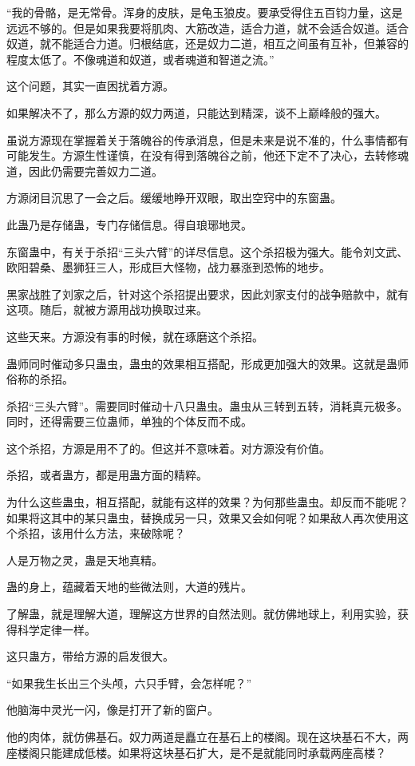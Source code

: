 \begin{this_body}
“我的骨骼，是无常骨。浑身的皮肤，是龟玉狼皮。要承受得住五百钧力量，这是远远不够的。但是如果我要将肌肉、大筋改造，适合力道，就不会适合奴道。适合奴道，就不能适合力道。归根结底，还是奴力二道，相互之间虽有互补，但兼容的程度太低了。不像魂道和奴道，或者魂道和智道之流。”

这个问题，其实一直困扰着方源。

如果解决不了，那么方源的奴力两道，只能达到精深，谈不上巅峰般的强大。

虽说方源现在掌握着关于落魄谷的传承消息，但是未来是说不准的，什么事情都有可能发生。方源生性谨慎，在没有得到落魄谷之前，他还下定不了决心，去转修魂道，因此仍需要完善奴力二道。

方源闭目沉思了一会之后。缓缓地睁开双眼，取出空窍中的东窗蛊。

此蛊乃是存储蛊，专门存储信息。得自琅琊地灵。

东窗蛊中，有关于杀招“三头六臂”的详尽信息。这个杀招极为强大。能令刘文武、欧阳碧桑、墨狮狂三人，形成巨大怪物，战力暴涨到恐怖的地步。

黑家战胜了刘家之后，针对这个杀招提出要求，因此刘家支付的战争赔款中，就有这项。随后，就被方源用战功换取过来。

这些天来。方源没有事的时候，就在琢磨这个杀招。

蛊师同时催动多只蛊虫，蛊虫的效果相互搭配，形成更加强大的效果。这就是蛊师俗称的杀招。

杀招“三头六臂”。需要同时催动十八只蛊虫。蛊虫从三转到五转，消耗真元极多。同时，还得需要三位蛊师，单独的个体反而不成。

这个杀招，方源是用不了的。但这并不意味着。对方源没有价值。

杀招，或者蛊方，都是用蛊方面的精粹。

为什么这些蛊虫，相互搭配，就能有这样的效果？为何那些蛊虫。却反而不能呢？如果将这其中的某只蛊虫，替换成另一只，效果又会如何呢？如果敌人再次使用这个杀招，该用什么方法，来破除呢？

人是万物之灵，蛊是天地真精。

蛊的身上，蕴藏着天地的些微法则，大道的残片。

了解蛊，就是理解大道，理解这方世界的自然法则。就仿佛地球上，利用实验，获得科学定律一样。

这只蛊方，带给方源的启发很大。

“如果我生长出三个头颅，六只手臂，会怎样呢？”

他脑海中灵光一闪，像是打开了新的窗户。

他的肉体，就仿佛基石。奴力两道是矗立在基石上的楼阁。现在这块基石不大，两座楼阁只能建成低楼。如果将这块基石扩大，是不是就能同时承载两座高楼？


\end{this_body}
